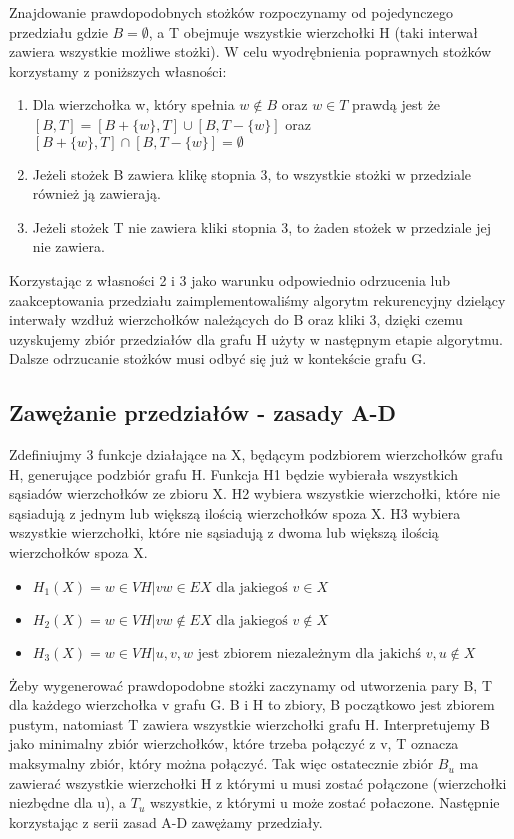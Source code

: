 \documentclass[11pt]{article}
\begin{document}
Znajdowanie prawdopodobnych stożków rozpoczynamy od pojedynczego przedziału gdzie $B = \emptyset$, a T obejmuje wszystkie wierzchołki H (taki interwał zawiera wszystkie możliwe stożki). W celu wyodrębnienia poprawnych stożków korzystamy z poniższych własności:
\begin{enumerate}
\item Dla wierzchołka w, który spełnia $w \notin B$ oraz $w\in T$ prawdą jest że $[B, T] = [B + \{ w\}, T] \cup [B , T - \{ w\}]$ oraz $[B +\{ w\}, T] \cap [B , T - \{ w\}] = \emptyset$

\item Jeżeli stożek B zawiera klikę stopnia 3, to wszystkie stożki w przedziale również ją zawierają. 

\item Jeżeli stożek T nie zawiera kliki stopnia 3, to żaden stożek w przedziale jej nie zawiera.
\end{enumerate}

Korzystając z własności 2 i 3 jako warunku odpowiednio odrzucenia lub zaakceptowania przedziału zaimplementowaliśmy algorytm rekurencyjny dzielący interwały wzdłuż wierzchołków należących do B oraz kliki 3, dzięki czemu uzyskujemy zbiór przedziałów dla grafu H użyty w następnym etapie algorytmu.
Dalsze odrzucanie stożków musi odbyć się już w kontekście grafu G.
  

\subsection{Zawężanie przedziałów - zasady A-D}
Zdefiniujmy 3 funkcje działające na X, będącym podzbiorem wierzchołków grafu H, generujące podzbiór grafu H. 
Funkcja H1 będzie wybierała wszystkich sąsiadów wierzchołków ze zbioru X.
H2 wybiera wszystkie wierzchołki, które nie sąsiadują z jednym lub większą ilością wierzchołków spoza X. 
H3 wybiera wszystkie wierzchołki, które nie sąsiadują z dwoma lub większą ilością wierzchołków spoza X.
\begin{itemize}
    
  \item   $H_1(X) = { w \in VH | vw \in EX \textrm{ dla jakiegoś } v \in X }$ 
  
  \item   $H_2(X) = { w \in VH | vw \notin EX \textrm{ dla jakiegoś } v \notin X}$
  
  \item   $H_3(X) = { w \in VH | { u, v, w } \textrm{ jest zbiorem niezależnym dla jakichś } v, u \notin X}$ 
\end{itemize}
Żeby wygenerować prawdopodobne stożki zaczynamy od utworzenia pary {B, T} dla każdego wierzchołka v grafu G.
B i H to zbiory, B początkowo jest zbiorem pustym, natomiast T zawiera wszystkie wierzchołki grafu H. 
Interpretujemy B jako minimalny zbiór wierzchołków, które trzeba połączyć z v, T oznacza maksymalny zbiór, który można połączyć.
Tak więc ostatecznie zbiór $B_u$ ma zawierać wszystkie wierzchołki H z którymi u musi zostać połączone (wierzchołki niezbędne dla u), 
a $T_u$ wszystkie, z którymi u może zostać połaczone. 
Następnie korzystając z serii zasad A-D zawężamy przedziały.
\end{document}
